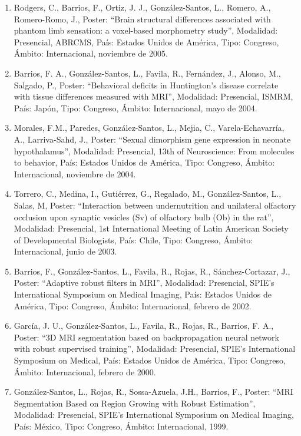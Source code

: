 \begin{enumerate}
\item Rodgers, C., Barrios, F., Ortiz, J. J., González-Santos, L., Romero, A., Romero-Romo, J., Poster: “Brain 
structural differences associated with phantom limb sensation: a voxel-based morphometry study”, Modalidad: 
Presencial, ABRCMS, País: Estados Unidos de América, Tipo: Congreso, Ámbito: Internacional, noviembre de 2005.

\item Barrios, F. A., González-Santos, L., Favila, R., Fernández, J., Alonso, M., Salgado, P., Poster: 
“Behavioral 
deficits in Huntington’s disease correlate with tissue differences measured with MRI”, Modalidad: Presencial, 
ISMRM, País: Japón, Tipo: Congreso, Ámbito: Internacional, mayo de 2004.

\item Morales, F.M., Paredes, González-Santos, L., Mejia, C., Varela-Echavarría, A., Larriva-Sahd, J., Poster: 
“Sexual dimorphism gene expression in neonate hypothalamus”, Modalidad: Presencial, 13th of Neuroscience: From 
molecules to behavior, País: Estados Unidos de América, Tipo: Congreso, Ámbito: Internacional, noviembre de 
2004.

\item Torrero, C., Medina, I., Gutiérrez, G., Regalado, M., González-Santos, L., Salas, M, Poster: 
“Interaction 
between undernutrition and unilateral olfactory occlusion upon synaptic vesicles (Sv) of olfactory bulb (Ob) 
in the rat”, Modalidad: Presencial, 1st International Meeting of Latin American Society of Developmental 
Biologists, País: Chile, Tipo: Congreso, Ámbito: Internacional, junio de 2003.

\item Barrios, F., González-Santos, L., Favila, R., Rojas, R., Sánchez-Cortazar, J., Poster: “Adaptive robust 
filters in MRI”, Modalidad: Presencial, SPIE's International Symposium on Medical Imaging, País: Estados 
Unidos de América, Tipo: Congreso, Ámbito: Internacional, febrero de 2002.

\item García, J. U., González-Santos, L., Favila, R., Rojas, R., Barrios, F. A., Poster: “3D MRI segmentation 
based 
on backpropagation neural network with robust supervised training”, Modalidad: Presencial, SPIE's 
International Symposium on Medical, País: Estados Unidos de América, Tipo: Congreso, Ámbito: Internacional, 
febrero de 2000.

\item González-Santos, L., Rojas, R., Sossa-Azuela, J.H., Barrios, F., Poster: “MRI Segmentation Based on 
Region 
Growing with Robust Estimation”, Modalidad: Presencial, SPIE's International Symposium on Medical Imaging, 
País: México, Tipo: Congreso, Ámbito: Internacional, 1999.


\end{enumerate}
